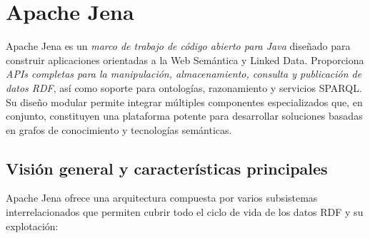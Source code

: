 \documentclass{article}
\begin{document}
\section{Apache Jena}

Apache Jena es un \textit{marco de trabajo de código abierto para Java} diseñado para construir aplicaciones orientadas a la Web Semántica y Linked Data. Proporciona \textit{APIs completas para la manipulación, almacenamiento, consulta y publicación de datos RDF}, así como soporte para ontologías, razonamiento y servicios SPARQL. Su diseño modular permite integrar múltiples componentes especializados que, en conjunto, constituyen una plataforma potente para desarrollar soluciones basadas en grafos de conocimiento y tecnologías semánticas.

\subsection{Visión general y características principales}

Apache Jena ofrece una arquitectura compuesta por varios subsistemas interrelacionados que permiten cubrir todo el ciclo de vida de los datos RDF y su explotación:
\end{document}

